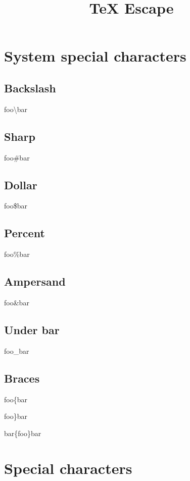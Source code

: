 \documentclass[a4paper,11pt,oneside,openany,report]{jsbook}
\title{TeX Escape}
\begin{document}
\maketitle
\chapter{System special characters}\label{ch:System special characters}
\section{Backslash}\label{sec:System special characters/Backslash}
foo{\textbackslash}bar

\section{Sharp}\label{sec:System special characters/Sharp}
foo{\#}bar

\section{Dollar}\label{sec:System special characters/Dollar}
foo{\$}bar

\section{Percent}\label{sec:System special characters/Percent}
foo{\%}bar

\section{Ampersand}\label{sec:System special characters/Ampersand}
foo{\&}bar

\section{Under bar}\label{sec:System special characters/Under bar}
foo{\_}bar

\section{Braces}\label{sec:System special characters/Braces}
foo\{bar

foo\}bar

bar\{foo\}bar

\chapter{Special characters}\label{ch:Special characters}
\end{document}
